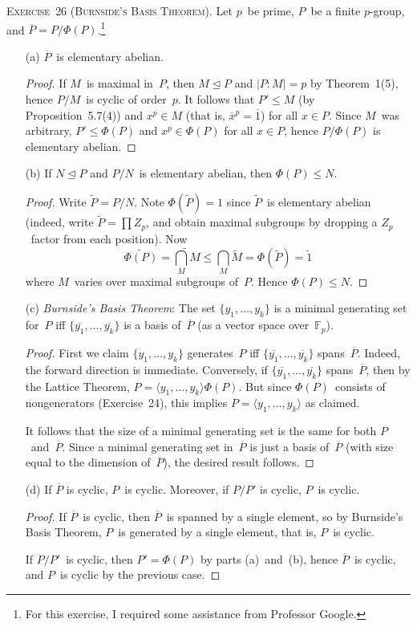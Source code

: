 \documentclass[letterpaper]{article}
\newcommand{\exercise}[1]{\goodbreak\noindent\textsc{Exercise~{#1}.}}
\newcommand{\F}{\mathbb{F}}
\newcommand{\bigsect}{\bigcap}
\newcommand{\subgroup}{\le}
\newcommand{\normal}{\trianglelefteq}
\newcommand{\res}[1]{\overline{#1}}
\newcommand{\gen}[1]{\langle{#1}\rangle}
\newcommand{\gindex}[2]{|{#1}:{#2}|}
\begin{document}
\exercise{26 (Burnside's Basis Theorem)}
Let $p$~be prime, $P$~be a finite $p$-group, and $\res{P}=P/\Phi(P)$.\footnote{For this exercise, I required some assistance from Professor Google.}
\begin{enumerate}[itemsep=0pt]
\item[(a)] $\res{P}$~is elementary abelian.
\begin{proof}
If $M$~is maximal in~$P$, then $M\normal P$ and $\gindex{P}{M}=p$ by Theorem~1(5), hence $P/M$~is cyclic of order~$p$. It follows that $P'\subgroup M$ (by Proposition~5.7(4)) and $x^p\in M$ (that is, $\res{x}^p=\res{1}$) for all $x\in P$. Since $M$~was arbitrary, $P'\subgroup\Phi(P)$ and $x^p\in\Phi(P)$ for all $x\in P$, hence $P/\Phi(P)$ is elementary abelian.
\end{proof}
\item[(b)] If $N\normal P$ and $P/N$~is elementary abelian, then $\Phi(P)\subgroup N$.
\begin{proof}
Write $\widetilde{P}=P/N$. Note $\Phi(\widetilde{P})=1$ since $\widetilde{P}$~is elementary abelian (indeed, write $\widetilde{P}=\prod Z_p$, and obtain maximal subgroups by dropping a $Z_p$~factor from each position). Now
$$\widetilde{\Phi(P)}=\widetilde{\bigsect_M M}\subgroup\bigsect_M\widetilde{M}=\Phi(\widetilde{P})=\widetilde{1}$$
where $M$~varies over maximal subgroups of~$P$. Hence $\Phi(P)\subgroup N$.
\end{proof}
\item[(c)]
\emph{Burnside's Basis Theorem}: The set $\{y_1,\ldots,y_k\}$ is a minimal generating set for~$P$ iff $\{\res{y_1},\ldots,\res{y_k}\}$ is a basis of~$\res{P}$ (as a vector space over~$\F_p$).
\begin{proof}
First we claim $\{y_1,\ldots,y_k\}$ generates~$P$ iff $\{\res{y_1},\ldots,\res{y_k}\}$ spans~$\res{P}$. Indeed, the forward direction is immediate. Conversely, if $\{\res{y_1},\ldots,\res{y_k}\}$ spans~$\res{P}$, then by the Lattice Theorem, $P=\gen{y_1,\ldots,y_k}\Phi(P)$. But since $\Phi(P)$~consists of nongenerators (Exercise~24), this implies $P=\gen{y_1,\ldots,y_k}$ as claimed.

It follows that the size of a minimal generating set is the same for both $P$~and~$\res{P}$. Since a minimal generating set in~$\res{P}$ is just a basis of~$\res{P}$ (with size equal to the dimension of~$\res{P}$), the desired result follows.
\end{proof}

\item[(d)] If $\res{P}$ is cyclic, $P$~is cyclic. Moreover, if $P/P'$ is cyclic, $P$~is cyclic.
\begin{proof}
If $\res{P}$~is cyclic, then $\res{P}$~is spanned by a single element, so by Burnside's Basis Theorem, $P$~is generated by a single element, that is, $P$~is cyclic.

If $P/P'$~is cyclic, then $P'=\Phi(P)$ by parts (a)~and~(b), hence $\res{P}$~is cyclic, and $P$~is cyclic by the previous case.
\end{proof}
\end{enumerate}
\end{document}
